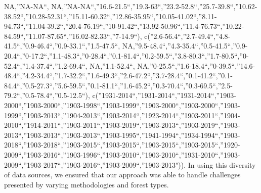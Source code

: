 \documentclass[
]{article}
\begin{document}
NA,''NA-NA``,
NA,''NA-NA``,''16.6-21.5``,''19.3-63``,''23.2-52.8``,''25.7-39.8``,''10.62-38.52``,''10.28-52.31``,''15.11-60.32``,''12.86-35.95``,''10.05-41.02``,''8.11-94.73``,''11.04-39.2``,''20.4-76.19``,''10-91.42``,''13.92-50.96``,''11.4-76.73``,''10.22-84.59``,''11.07-87.65``,''16.02-82.33``,''7-14.9``),
c(''2.6-56.4``,''2.7-49.4``,''4.8-41.5``,''0.9-46.4``,''0.9-33.1``,''1.5-47.5``,
NA,''9.5-48.4``,''4.3-35.4``,''0.5-41.5``,''0.9-20.4``,''0-17.2``,''1.1-48.3``,''0-28.4``,''0.1-81.4``,''0.2-59.5``,''3.8-80.3``,''1.7-80.5``,''0-52.4``,''1.4-37.4``,''1.2-69.4``,
NA,''1.1-52.4``,
NA,''0-25.5``,''1.6-18.4``,''0-39.5``,''14.6-48.4``,''4.2-34.4``,''1.7-32.2``,''1.6-49.3``,''2.6-47.2``,''3.7-28.4``,''0.1-41.2``,''0.1-84.4``,''0.5-27.3``,''5.6-59.5``,''0.1-81.1``,''1.6-45.2``,''0.3-70.4``,''0.3-69.5``,''2.5-79.2``,''0.5-78.4``,''0.5-12.5``),
c(''1931-2014``,''1931-2014``,''1931-2014``,''1903-2000``,''1903-2000``,''1903-1998``,''1903-1999``,''1903-2000``,''1903-2000``,''1903-1999``,''1903-2013``,''1904-2013``,''1903-2014``,''1923-2014``,''1903-2011``,''1904-2010``,''1914-2011``,''1903-2011``,''1903-2019``,''1903-2013``,''1903-2019``,''1903-2013``,''1903-2013``,''1903-2013``,''1903-1995``,''1941-1994``,''1934-1994``,''1903-2018``,''1903-2018``,''1903-2015``,''1903-2015``,''1903-2015``,''1903-2015``,''1920-2009``,''1903-2016``,''1903-1996``,''1903-2010``,''1903-2010``,''1931-2010``,''1903-2009``,''1903-2017``,''1903-2016``,''1903-2009``,''1903-2013")).
In using this diversity of data sources, we ensured that our approach
was able to handle challenges presented by varying methodologies and
forest types.
\end{document}
